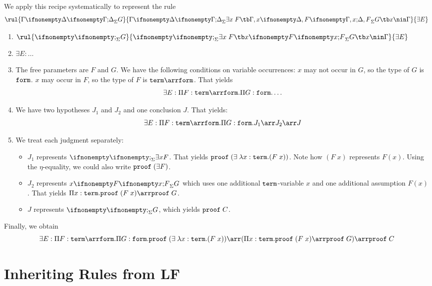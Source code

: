 We apply this recipe systematically to represent the rule
\[\rul{\iscons{\Sigma}{\Gamma}{\Delta}{G}}
      {   \iscons{\Sigma}{\Gamma}{\Delta}{\exists x\;F}
       \tb\iscons{\Sigma}{\Gamma,x}{\Delta,F}{G}
       \tb x\nin\Gamma
      }
      {\exists E}
\]
\begin{enumerate}
	\item $\rul{\iscons{\Sigma}{}{}{G}}
      {   \iscons{\Sigma}{}{}{\exists x\;F}
       \tb\iscons{\Sigma}{x}{F}{G}
       \tb x\nin\Gamma
      }
      {\exists E}$
  \item $\exists E:\ldots$
  \item The free parameters are $F$ and $G$. We have the following conditions on variable occurrences: $x$ may not occur in $G$, so the type of $G$ is $\mathtt{form}$. $x$ may occur in $F$, so the type of $F$ is $\TERM\arr\FORM$. That yields
  \[\exists E:\P{F}{\TERM\arr\FORM}\P{G}{\FORM}\ldots\]
  \item We have two hypotheses $J_1$ and $J_2$ and one conclusion $J$. That yields:
    \[\exists E:\P{F}{\TERM\arr\FORM}\P{G}{\FORM}J_1\arr J_2\arr J\]
  \item We treat each judgment separately:
    \begin{itemize}
	    \item $J_1$ represents $\iscons{\Sigma}{}{}{\exists x F}$. That yields $\mathtt{proof}\;(\exists\;\lambda x:\mathtt{term}.(F\;x))$. Note how $(F\;x)$ represents $F(x)$. Using the $\eta$-equality, we could also write $\mathtt{proof}\;(\exists F)$.
	    \item $J_2$ represents $\iscons{\Sigma}{x}{F}{G}$ which uses one additional $\mathtt{term}$-variable $x$ and one additional assumption $F(x)$. That yields $\P{x}{\TERM}\PROOF\;(F\;x)\arr\PROOF\;G$.
	    \item $J$ represents $\iscons{\Sigma}{}{}{G}$, which yields $\mathtt{proof}\;C$.
    \end{itemize}
\end{enumerate}

Finally, we obtain
\[\exists E:\P{F}{\TERM\arr\FORM}\P{G}{\FORM}
            \PROOF\;(\exists\;\lam{x}{\TERM}(F\;x)) \arr
            (\P{x}{\TERM}\PROOF\;(F\;x)\arr\PROOF\;G) \arr
            \PROOF\;C
\]

\section{Inheriting Rules from LF}

